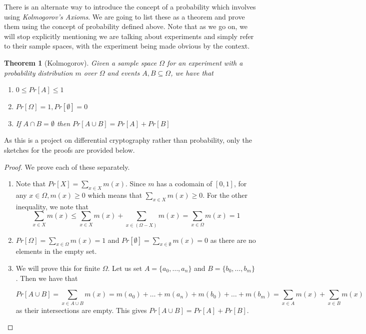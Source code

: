 \documentclass[12pt,a4paper]{article}
\newtheorem{theorem}{Theorem}
\begin{document}
There is an alternate way to introduce the concept of a probability which
involves using \textit{Kolmogorov's Axioms}. We are going to list these as
a theorem and prove them using the concept of probability defined
above. Note that as we go on, we will stop explicitly mentioning we are talking
about experiments and simply refer to their sample spaces, with the experiment
being made obvious by the context.
\begin{theorem}[Kolmogorov]
\label{thm:kol}
Given a sample space $\Omega$ for an experiment with a probability distribution
$m$ over $\Omega$ and events $A,B \subseteq \Omega$, we have that 
\begin{enumerate}
    \item $0 \leq Pr[A] \leq 1$
    \item $Pr[\Omega] = 1, Pr[\emptyset] = 0$
    \item If  $A \cap B = \emptyset$ then $Pr[A \cup B] = Pr[A] + Pr[B]$
\end{enumerate}
\end{theorem}

As this is a project on differential cryptography rather than probability, only
the sketches for the proofs are provided below.

\begin{proof}
We prove each of these separately.
\begin{enumerate}
\item Note that $Pr[X] = \sum_{x \in X} m(x)$. Since $m$ has a codomain of
$[0,1]$, for any $x \in \Omega, m(x) \geq 0$ which means that $\sum_{x \in X}
m(x) \geq 0$. For the other inequality, we note that
\[\sum_{x \in X} m(x) \leq \sum_{x \in X} m(x) + \sum_{x \in (\Omega - X)} m(x)
= \sum_{x \in \Omega} m(x) = 1\]

\item $Pr[\Omega] = \sum_{x \in \Omega} m(x) = 1$ and $Pr[\emptyset]
= \sum_{x \in \emptyset} m(x) = 0$ as there are no elements in the empty set. 

\item We will prove this for finite $\Omega$. Let us set $A = \{a_0, \ldots,
a_n\}$ and $B = \{b_0, \ldots, b_m\}$. Then we have that

\[Pr[A \cup B] = \sum_{x \in A \cup B} m(x) = m(a_0) + \ldots + m(a_n) + m(b_0)
+ \ldots + m(b_m) = \sum_{x \in A} m(x) + \sum_{x \in B} m(x)\] as their
intersections are empty. This gives $Pr[A \cup B] = Pr[A] + Pr[B]$.
\end{enumerate}
\end{proof}
\end{document}
